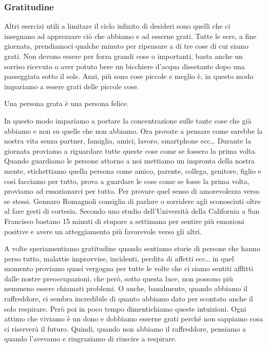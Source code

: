\documentclass[12pt]{book} %
\begin{document}
\subsubsection{Gratitudine}
Altri esercizi utili a limitare il ciclo infinito
di desideri sono quelli che ci insegnano ad apprezzare ciò che abbiamo e ad esserne grati. Tutte le sere, a fine
giornata, prendiamoci qualche minuto per ripensare a di tre cose di cui siamo grati.
Non devono essere per forza grandi cose o importanti, basta anche un sorriso ricevuto o aver potuto bere un bicchiere
d'acqua dissetante dopo una passeggiata sotto il sole. Anzi, più
sono cose piccole e meglio è, in questo modo impariamo a essere grati delle piccole cose. 

Una persona grata è una persona felice. 

In questo modo impariamo a portare la concentrazione sulle tante cose che già abbiamo e non su quelle che non abbiamo.
Ora provate a pensare come sarebbe la nostra vita senza partner, famiglia, amici, lavoro, smartphone ecc… Durante la
giornata proviamo a riguardare tutte queste cose come se fossero la prima volta. Quando guardiamo le persone attorno a
noi mettiamo un impronta della nostra mente, etichettiamo quella persona come amico, parente, collega, genitore, figlio
e così facciamo per tutto, prova a guardare le cose come se fosse la prima volta, proviamo ad emozionarci per tutto.
Per provare quel senso di amorevolezza verso se stessi. Gennaro Romagnoli consiglia di parlare o sorridere agli
sconosciuti oltre al fare gesti di cortesia. Secondo uno studio dell'Università della California a San Francisco
bastano 15 minuti di stupore a settimana per sentire più emozioni positive e avere un
atteggiamento più favorevole verso gli altri.

A volte speriamentiamo gratitudine quando sentiamo storie di persone che hanno perso tutto, malattie improvvise, incidenti,
perdita di affetti ecc… in quel momento proviamo quasi vergogna per tutte le volte che ci siamo sentiti afflitti dalle
nostre preoccupazioni, che però, sotto questa luce, non possono più nemmeno essere chiamati problemi. O anche,
banalmente, quando abbiamo il raffreddore, ci sembra incredibile di quanto abbiamo dato per scontato anche il solo
respirare. Però poi in poco tempo dimentichiamo queste intuizioni. Ogni attimo che viviamo è un dono e dobbiamo
esserne grati perché non sappiamo cosa ci riserverà il futuro. Quindi, quando non abbiamo il raffreddore, pensiamo a quando l'avevamo e ringraziamo di riuscire a respirare.
\end{document}
